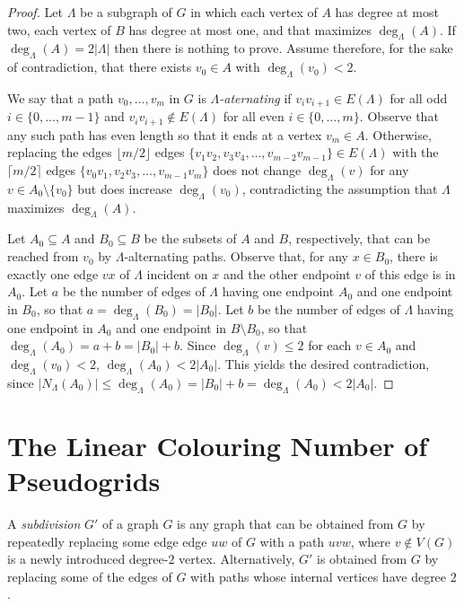 \documentclass{patmorin}
\begin{document}
\begin{proof}
  Let $\Lambda$ be a subgraph of $G$ in which each vertex of $A$ has degree at most two, each vertex of $B$ has degree at most one, and that maximizes $\deg_\Lambda(A)$.  If $\deg_{\Lambda}(A) = 2|\Lambda|$ then there is nothing to prove. Assume therefore, for the sake of contradiction,  that there exists $v_0\in A$ with $\deg_\Lambda(v_0) < 2$.  
  
  We say that a path $v_0,\ldots,v_m$ in $G$ is \emph{$\Lambda$-aternating} if $v_iv_{i+1}\in E(\Lambda)$ for all odd $i\in\{0,\ldots,m-1\}$ and $v_iv_{i+1}\not\in E(\Lambda)$ for all even $i\in\{0,\ldots,m\}$.  Observe that any such path has even length so that it ends at a vertex $v_m\in A$.  Otherwise, replacing the edges $\lfloor m/2\rfloor$ edges $\{v_1v_2,v_3v_4,\ldots,v_{m-2}v_{m-1}\}\in E(\Lambda)$ with the $\lceil m/2\rceil$ edges $\{v_0v_1,v_2v_3,\ldots,v_{m-1}v_m\}$ does not change $\deg_\Lambda(v)$ for any $v\in A_0\setminus\{v_0\}$ but does increase  $\deg_\Lambda(v_0)$, contradicting the assumption that $\Lambda$ maximizes $\deg_\Lambda(A)$.
  
  Let $A_0\subseteq A$ and $B_0\subseteq B$ be the subsets of $A$ and $B$, respectively, that can be reached from $v_0$ by $\Lambda$-alternating paths.
  Observe that, for any $x\in B_0$,  there is exactly one edge $vx$ of $\Lambda$ incident on $x$ and the other endpoint $v$ of this edge is in $A_0$.  Let $a$ be the number of edges of $\Lambda$ having one endpoint $A_0$ and one endpoint in $B_0$, so that $a=\deg_\Lambda(B_0)=|B_0|$.  Let $b$ be the number of edges of $\Lambda$ having one endpoint in $A_0$ and one endpoint in $B\setminus B_0$, so that $\deg_\Lambda(A_0)=a+b = |B_0|+b$.    Since $\deg_{\Lambda}(v) \le 2$ for each $v\in A_0$ and $\deg_\Lambda(v_0)<2$, $\deg_\Lambda(A_0)<2|A_0|$.  This yields the desired contradiction, since $|N_\Lambda(A_0)| \le \deg_\Lambda(A_0) = |B_0|+b = \deg_\Lambda(A_0)< 2|A_0|$.
\end{proof}


\section{The Linear Colouring Number of Pseudogrids}

A \emph{subdivision} $G'$ of a graph $G$ is any graph that can be obtained from $G$ by repeatedly replacing some edge edge $uw$ of $G$ with a path $uvw$, where $v\not\in V(G)$ is a newly introduced degree-$2$ vertex.  Alternatively, $G'$ is obtained from $G$ by replacing some of the edges of $G$ with paths whose internal vertices have degree $2$.
\end{document}
